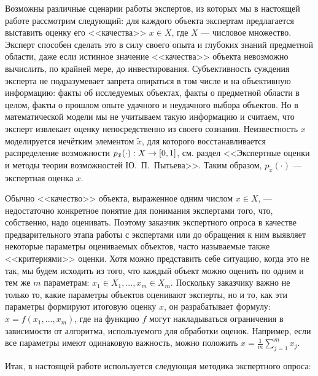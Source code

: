 Возможны различные сценарии работы экспертов, из которых мы в настоящей работе рассмотрим следующий: для каждого объекта экспертам предлагается выставить оценку его <<качества>> $x \in X$, где $X$ --- числовое множество. Эксперт способен сделать это в силу своего опыта и глубоких знаний предметной области, даже если истинное значение <<качества>> объекта невозможно вычислить, по крайней мере, до инвестирования. Субъективность суждения эксперта не подразумевает запрета опираться в том числе и на объективную информацию: факты об исследуемых объектах, факты о предметной области в целом, факты о прошлом опыте удачного и неудачного выбора объектов. Но в математической модели мы не учитываем такую информацию и считаем, что эксперт извлекает оценку непосредственно из своего сознания. Неизвестность $x$ моделируется нечётким элементом $\tilde x$, для которого восстанавливается  распределение возможности $p_{\tilde x}(\cdot): X \rightarrow [0,1]$, см. раздел <<Экспертные оценки и методы теории возможностей Ю.~П.~Пытьева>>. Таким образом, $p_{\tilde x}(\cdot)$ --- экспертная оценка $x$.    

Обычно <<качество>> объекта, выраженное одним числом $x \in X$, --- недостаточно конкретное понятие для понимания экспертами того, что, собственно, надо оценивать. Поэтому заказчик экспертного опроса в качестве предварительного этапа работы с экспертами или до обращения к ним выявляет некоторые параметры оцениваемых объектов, часто называемые также <<критериями>> оценки. Хотя можно представить себе ситуацию, когда это не так, мы будем исходить из того, что каждый объект можно оценить по одним и тем же $m$ параметрам: $x_1 \in X_1, ..., x_m \in X_m$.  Поскольку заказчику важно не только то, какие параметры объектов оценивают эксперты, но и то, как эти параметры формируют итоговую оценку $x$, он разрабатывает формулу: $x = f(x_1, ..., x_m)$, где на функцию $f$ могут накладываться ограничения в зависимости от алгоритма, используемого для обработки оценок. Например, если все параметры имеют одинаковую важность, можно положить $x = \frac{1}{m}\sum_{j=1}^m{x_j}$.


Итак, в настоящей работе используется следующая методика экспертного опроса:
\begin{center}  \end{center}

